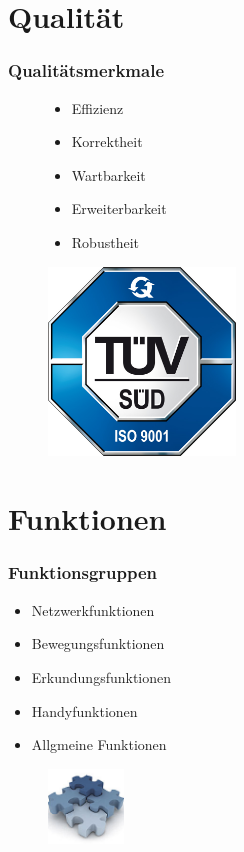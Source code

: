 \documentclass{beamer}
\begin{document}
\begin{frame}
		
		 
\end{frame}

\section{Qualität}
\begin{frame}
  \frametitle{Qualitätsmerkmale}
	\begin{figure}[htbp]
	
	\begin{minipage}[t]{0.5\textwidth}
		\begin{itemize}
			\item Effizienz
			\item Korrektheit
			\item Wartbarkeit
			\item Erweiterbarkeit
			\item Robustheit
		\end{itemize}
	\end{minipage}
	\hfill
	\begin{minipage}[t]{5cm}
		\vspace{0pt}
		\includegraphics[height=5cm]{images/qualitt.jpg} 
	\end{minipage}
   \end{figure}  	  
  
\end{frame}

\section{Funktionen}
\begin{frame}
  \frametitle{Funktionsgruppen}
  
  	\begin{itemize}
		\item Netzwerkfunktionen
		\item Bewegungsfunktionen
		\item Erkundungsfunktionen
		\item Handyfunktionen
		\item Allgmeine Funktionen
	\end{itemize}  
	\begin{figure}[bp]
		\includegraphics[height=2cm]{images/funktional.jpg} 
	\end{figure}
	
\end{frame}
\end{document}

